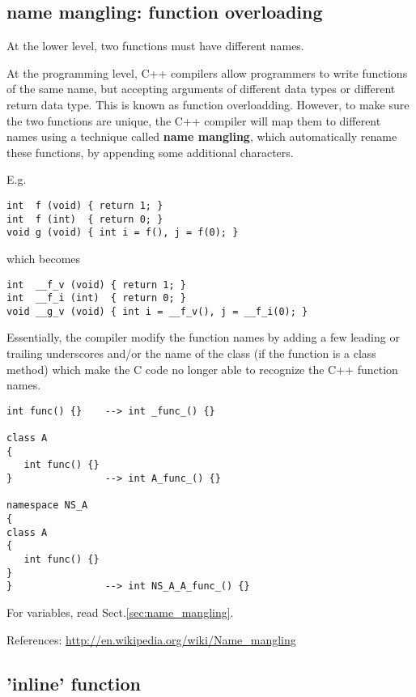 \subsection{name mangling: function overloading}
\label{sec:name_mangling-function}
\label{sec:function_overloading}

At the lower level, two functions must have different names. 

At the programming level, C++ compilers allow programmers to write functions of
the same name, but accepting arguments of different data types or different
return data type. This is known as function overloadding.
However, to make sure the two functions are unique, the C++ compiler will map
them to different names using a technique called {\bf name mangling}, which
automatically rename these functions, by appending some additional characters.


E.g.
\begin{verbatim}
int  f (void) { return 1; }
int  f (int)  { return 0; }
void g (void) { int i = f(), j = f(0); }
\end{verbatim}
which becomes
\begin{lstlisting}
int  __f_v (void) { return 1; }
int  __f_i (int)  { return 0; }
void __g_v (void) { int i = __f_v(), j = __f_i(0); }
\end{lstlisting}

Essentially, the compiler modify the function names by adding a few leading or
trailing underscores and/or the name of the class (if the function is a class
method) which make the C code no longer able to recognize the C++ function
names.

\begin{verbatim}
int func() {}    --> int _func_() {}

class A
{
   int func() {}
}                --> int A_func_() {} 

namespace NS_A
{
class A
{
   int func() {}
}                 
}                --> int NS_A_A_func_() {}
\end{verbatim}

For variables, read Sect.\ref{sec:name_mangling}.

References: \url{http://en.wikipedia.org/wiki/Name_mangling}

\subsection{'inline' function}
\label{sec:inline_C++98}

